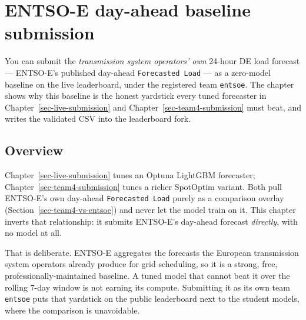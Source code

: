 \documentclass[
  english,
  letterpaper,
]{scrbook}
\begin{document}
\chapter{ENTSO-E day-ahead baseline
submission}\label{sec-entsoe-submission}

\begin{tcolorbox}[enhanced jigsaw, arc=.35mm, bottomrule=.15mm, bottomtitle=1mm, breakable, colback=white, colbacktitle=quarto-callout-note-color!10!white, colframe=quarto-callout-note-color-frame, coltitle=black, left=2mm, leftrule=.75mm, opacityback=0, opacitybacktitle=0.6, rightrule=.15mm, title=\textcolor{quarto-callout-note-color}{\faInfo}\hspace{0.5em}{Learning objective}, titlerule=0mm, toprule=.15mm, toptitle=1mm]

You can submit the \emph{transmission system operators' own} 24-hour DE
load forecast --- ENTSO-E's published day-ahead
\texttt{Forecasted\ Load} --- as a zero-model baseline on the live
leaderboard, under the registered team \texttt{entsoe}. The chapter
shows why this baseline is the honest yardstick every tuned forecaster
in Chapter~\ref{sec-live-submission} and
Chapter~\ref{sec-team4-submission} must beat, and writes the validated
CSV into the leaderboard fork.

\end{tcolorbox}

\section{Overview}\label{sec-entsoe-overview}

Chapter~\ref{sec-live-submission} tunes an Optuna LightGBM forecaster;
Chapter~\ref{sec-team4-submission} tunes a richer SpotOptim variant.
Both pull ENTSO-E's own day-ahead \texttt{Forecasted\ Load} purely as a
comparison overlay (Section~\ref{sec-team4-vs-entsoe}) and never let the
model train on it. This chapter inverts that relationship: it submits
ENTSO-E's day-ahead forecast \emph{directly}, with no model at all.

That is deliberate. ENTSO-E aggregates the forecasts the European
transmission system operators already produce for grid scheduling, so it
is a strong, free, professionally-maintained baseline. A tuned model
that cannot beat it over the rolling 7-day window is not earning its
compute. Submitting it as its own team \texttt{entsoe} puts that
yardstick on the public leaderboard next to the student models, where
the comparison is unavoidable.
\end{document}

